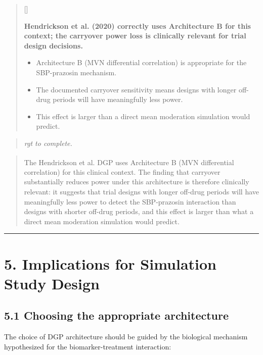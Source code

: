 \documentclass[
  11pt,
]{article}
\newcounter{pgraph}
\newenvironment{bullets}{%
  \stepcounter{pgraph}%
  \begin{quote}\small\sffamily\color[gray]{0.30}%
  {\normalfont\scriptsize\color[gray]{0.58}[\thepgraph]\enspace}}{%
  \end{quote}}
\newenvironment{rgt}{%
  \begin{quote}\small\itshape\color[RGB]{20,60,160}}{%
  \end{quote}}
\newenvironment{orig}{%
  \begin{quote}\normalsize\color[gray]{0.55}}{%
  \end{quote}}
\begin{document}
\begin{bullets}

\textbf{Hendrickson et al. (2020) correctly uses Architecture B
for this context; the carryover power loss is clinically
relevant for trial design decisions.}

\begin{itemize}\setlength{\itemsep}{2pt}\setlength{\parskip}{0pt}
\item Architecture B (MVN differential correlation) is
  appropriate for the SBP-prazosin mechanism.
\item The documented carryover sensitivity means designs with
  longer off-drug periods will have meaningfully less power.
\item This effect is larger than a direct mean moderation
  simulation would predict.
\end{itemize}

\end{bullets}

\begin{rgt}
rgt to complete.

\end{rgt}

\begin{orig}
The Hendrickson et
al.\textsuperscript{} DGP uses
Architecture B (MVN differential correlation) for this clinical context.
The finding that carryover substantially reduces power under this
architecture is therefore clinically relevant: it suggests that trial
designs with longer off-drug periods will have meaningfully less power
to detect the SBP-prazosin interaction than designs with shorter
off-drug periods, and this effect is larger than what a direct mean
moderation simulation would predict.

\end{orig}

\bigskip\noindent

\rule{\textwidth}{0.4pt}\bigskip

\section{5. Implications for Simulation Study Design}

\subsection{5.1 Choosing the appropriate architecture}

The choice of DGP architecture should be guided by the biological
mechanism hypothesized for the biomarker-treatment interaction:
\end{document}
